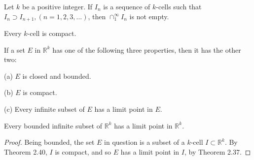 \begin{thm}
    \label{thm:2.39}
    Let $k$ be a positive integer. If ${I_n}$ is a sequence of $k$-cells such that $I_n \supset I_{n+1}, (n=1,2,3,...)$, then $\cap_1^\infty I_n$ is not empty.
\end{thm}

\begin{thm}
    \label{thm:2.40}
    Every $k$-cell is compact.
\end{thm}

\begin{thm}
    \label{thm:2.41}
    If a set $E$ in $\mathbb{R}^k$ has one of the following three properties, then it has the other two:

(a) $E$ is closed and bounded.

(b) $E$ is compact.

(c) Every infinite subset of $E$ has a limit point in $E$.
\end{thm}

\begin{thm}
    \label{thm:2.42 Weierstrass}
    Every bounded infinite subset of $\mathbb{R}^k$ has a limit point in $\mathbb{R}^k$.
\end{thm}

\begin{proof}
    Being bounded, the set $E$ in question is a subset of a $k$-cell $I\subset \mathbb{R}^k$.
    By Theorem 2.40, $I$ is compact, 
    and so $E$ has a limit point in $I$, by Theorem 2.37.
\end{proof}